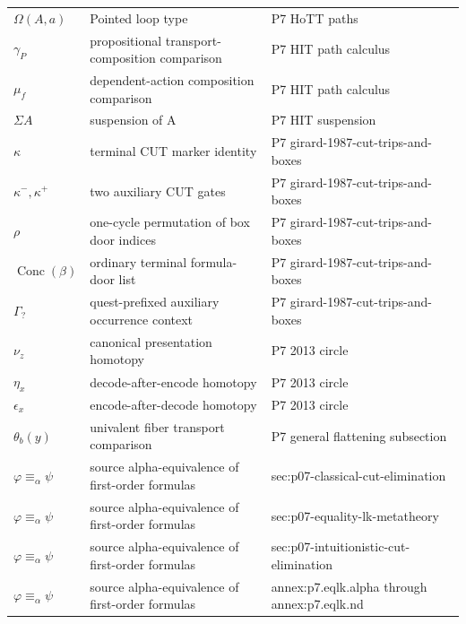 \begin{longtable}{@{}p{}p{}p{}@{}}
\(\Omega(A,\allowbreak a)\) & Pointed loop type & P7 HoTT paths \\
\(\gamma_P\) & propositional transport-composition comparison & P7 HIT path calculus \\
\(\mu_f\) & dependent-action composition comparison & P7 HIT path calculus \\
\(\Sigma A\) & suspension of A & P7 HIT suspension \\
\(\kappa\) & terminal CUT marker identity & P7 girard-\allowbreak{}1987-\allowbreak{}cut-\allowbreak{}trips-\allowbreak{}and-\allowbreak{}boxes \\
\(\kappa^-,\allowbreak \kappa^+\) & two auxiliary CUT gates & P7 girard-\allowbreak{}1987-\allowbreak{}cut-\allowbreak{}trips-\allowbreak{}and-\allowbreak{}boxes \\
\(\rho\) & one-cycle permutation of box door indices & P7 girard-\allowbreak{}1987-\allowbreak{}cut-\allowbreak{}trips-\allowbreak{}and-\allowbreak{}boxes \\
\(\operatorname{Conc}(\beta)\) & ordinary terminal formula-door list & P7 girard-\allowbreak{}1987-\allowbreak{}cut-\allowbreak{}trips-\allowbreak{}and-\allowbreak{}boxes \\
\(\Gamma_?\) & quest-prefixed auxiliary occurrence context & P7 girard-\allowbreak{}1987-\allowbreak{}cut-\allowbreak{}trips-\allowbreak{}and-\allowbreak{}boxes \\
\(\nu_z\) & canonical presentation homotopy & P7 2013 circle \\
\(\eta_x\) & decode-after-encode homotopy & P7 2013 circle \\
\(\epsilon_x\) & encode-after-decode homotopy & P7 2013 circle \\
\(\theta_b(y)\) & univalent fiber transport comparison & P7 general flattening subsection \\
\(\varphi\equiv_\alpha\psi\) & source alpha-equivalence of first-order formulas & sec:\allowbreak{}p07-\allowbreak{}classical-\allowbreak{}cut-\allowbreak{}elimination \\
\(\varphi\equiv_\alpha\psi\) & source alpha-equivalence of first-order formulas & sec:\allowbreak{}p07-\allowbreak{}equality-\allowbreak{}lk-\allowbreak{}metatheory \\
\(\varphi\equiv_\alpha\psi\) & source alpha-equivalence of first-order formulas & sec:\allowbreak{}p07-\allowbreak{}intuitionistic-\allowbreak{}cut-\allowbreak{}elimination \\
\(\varphi\equiv_\alpha\psi\) & source alpha-equivalence of first-order formulas & annex:\allowbreak{}p7.\allowbreak{}eqlk.\allowbreak{}alpha through annex:\allowbreak{}p7.\allowbreak{}eqlk.\allowbreak{}nd \\

\end{longtable}
